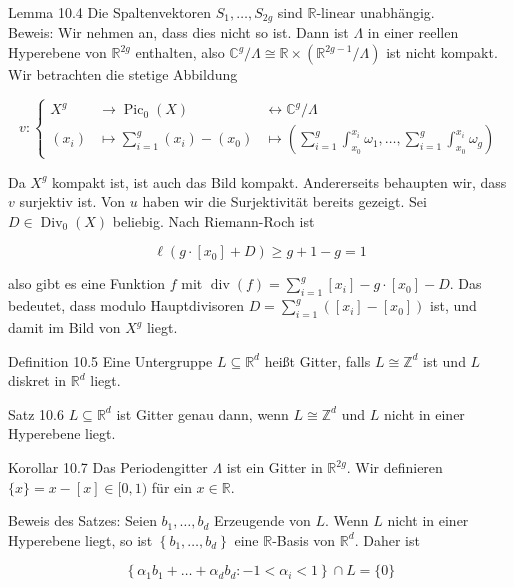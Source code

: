 \documentclass[10pt, letterpaper]{article}
\begin{document}
Lemma 10.4 Die Spaltenvektoren $S_{1}, \ldots, S_{2 g}$ sind $\mathbb{R}$-linear unabhängig.\\
Beweis: Wir nehmen an, dass dies nicht so ist. Dann ist $\Lambda$ in einer reellen Hyperebene von $\mathbb{R}^{2 g}$ enthalten, also $\mathbb{C}^{g} / \Lambda \cong \mathbb{R} \times\left(\mathbb{R}^{2 g-1} / \Lambda\right)$ ist nicht kompakt. Wir betrachten die stetige Abbildung

$$
v:\left\{\begin{array}{lll}
X^{g} & \longrightarrow \operatorname{Pic}_{0}(X) & \longleftrightarrow \mathbb{C}^{g} / \Lambda \\
\left(x_{i}\right) & \longmapsto \sum_{i=1}^{g}\left(x_{i}\right)-\left(x_{0}\right) & \longmapsto\left(\sum_{i=1}^{g} \int_{x_{0}}^{x_{i}} \omega_{1}, \ldots, \sum_{i=1}^{g} \int_{x_{0}}^{x_{i}} \omega_{g}\right)
\end{array}\right.
$$

Da $X^{g}$ kompakt ist, ist auch das Bild kompakt. Andererseits behaupten wir, dass $v$ surjektiv ist. Von $u$ haben wir die Surjektivität bereits gezeigt. Sei $D \in \operatorname{Div}_{0}(X)$ beliebig. Nach Riemann-Roch ist

$$
\ell\left(g \cdot\left[x_{0}\right]+D\right) \geqslant g+1-g=1
$$

also gibt es eine Funktion $f$ mit $\operatorname{div}(f)=\sum_{i=1}^{g}\left[x_{i}\right]-g \cdot\left[x_{0}\right]-D$. Das bedeutet, dass modulo Hauptdivisoren $D=\sum_{i=1}^{g}\left(\left[x_{i}\right]-\left[x_{0}\right]\right)$ ist, und damit im Bild von $X^{g}$ liegt.

Definition 10.5 Eine Untergruppe $L \subseteq \mathbb{R}^{d}$ heißt Gitter, falls $L \cong \mathbb{Z}^{d}$ ist und $L$ diskret in $\mathbb{R}^{d}$ liegt.

Satz 10.6 $L \subseteq \mathbb{R}^{d}$ ist Gitter genau dann, wenn $L \cong \mathbb{Z}^{d}$ und $L$ nicht in einer Hyperebene liegt.

Korollar 10.7 Das Periodengitter $\Lambda$ ist ein Gitter in $\mathbb{R}^{2 g}$. Wir definieren $\{x\}=x- [x] \in[0,1)$ für ein $x \in \mathbb{R}$.

Beweis des Satzes: Seien $b_{1}, \ldots, b_{d}$ Erzeugende von $L$. Wenn $L$ nicht in einer Hyperebene liegt, so ist $\left\{b_{1}, \ldots, b_{d}\right\}$ eine $\mathbb{R}$-Basis von $\mathbb{R}^{d}$. Daher ist

$$
\left\{\alpha_{1} b_{1}+\ldots+\alpha_{d} b_{d}:-1<\alpha_{i}<1\right\} \cap L=\{0\}
$$
\end{document}
